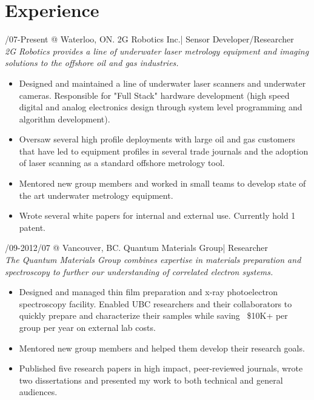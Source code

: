 \documentclass[10pt,letterpaper]{resume}
\begin{document}
\maketitle

\section{Experience}

/07-Present @ Waterloo, ON. 2G Robotics Inc.| Sensor Developer/Researcher
\textit{\\2G Robotics provides a line of underwater laser metrology equipment and imaging solutions to the offshore oil and gas industries.}
\begin{itemize}
\item Designed and maintained a line of underwater laser scanners and underwater cameras. Responsible for "Full Stack" hardware development (high speed digital and analog electronics design through system level programming and algorithm development).
\item Oversaw several high profile deployments with large oil and gas customers that have led to equipment profiles in several trade journals and the adoption of laser scanning as a standard offshore metrology tool.
\item Mentored new group members and worked in small teams to develop state of the art underwater metrology equipment.
\item Wrote several white papers for internal and external use. Currently hold 1 patent. 
\end{itemize}


/09-2012/07 @ Vancouver, BC. Quantum Materials Group| Researcher
\textit{\\The Quantum Materials Group combines expertise in materials preparation and spectroscopy to further our understanding of correlated electron systems.}
\begin{itemize}
\item Designed and managed thin film preparation and x-ray photoelectron spectroscopy facility. Enabled UBC researchers and their collaborators to quickly prepare and characterize their samples while saving ~\$10K+ per group per year on external lab costs. 
\item Mentored new group members and helped them develop their research goals.
\item Published five research papers in high impact, peer-reviewed journals, wrote two dissertations and presented my work to both technical and general audiences.
\end{itemize}
\end{document}
